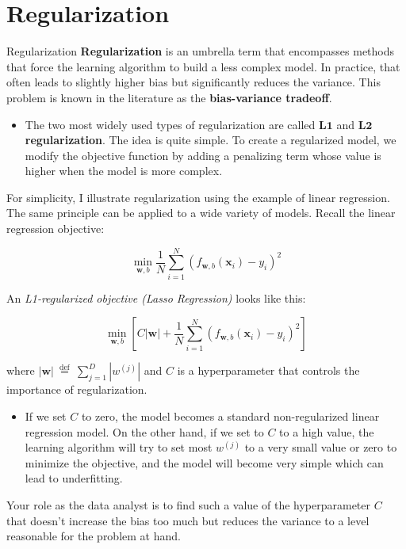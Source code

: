 \documentclass[8pt,dvipsnames]{beamer}
\begin{document}
\section{Regularization}
\begin{frame}{Regularization}
	\textbf{Regularization} is an umbrella term that encompasses methods that force the learning algorithm to build a less complex model. In practice, that often leads to slightly higher bias but significantly reduces the variance. This problem is known in the literature as the \textbf{bias-variance tradeoff}.
	\begin{itemize}
		\item The two most widely used types of regularization are called $\mathbf{L 1}$ and $\mathbf{L 2}$ \textbf{regularization}. The idea is quite simple. To create a regularized model, we modify the objective function by adding a penalizing term whose value is higher when the model is more complex.
	\end{itemize}
\end{frame}

\begin{frame}
	For simplicity, I illustrate regularization using the example of linear regression. The same principle can be applied to a wide variety of models.
	Recall the linear regression objective:

	$$
		\min _{\mathbf{w}, b} \frac{1}{N} \sum_{i=1}^{N}\left(f_{\mathbf{w}, b}\left(\mathbf{x}_{i}\right)-y_{i}\right)^{2}
	$$
\end{frame}

\begin{frame}
	An \textit{L1-regularized objective (Lasso Regression)} looks like this:

	$$
		\min _{\mathbf{w}, b}\left[C|\mathbf{w}|+\frac{1}{N} \sum_{i=1}^{N}\left(f_{\mathbf{w}, b}\left(\mathbf{x}_{i}\right)-y_{i}\right)^{2}\right]
	$$

	where $|\mathbf{w}| \stackrel{\text { def }}{=} \sum_{j=1}^{D}\left|w^{(j)}\right|$ and $C$ is a hyperparameter that controls the importance of regularization.
	\begin{itemize}
		\item If we set $C$ to zero, the model becomes a standard non-regularized linear regression model. On the other hand, if we set to $C$ to a high value, the learning algorithm will try to set most $w^{(j)}$ to a very small value or zero to minimize the objective, and the model will become very simple which can lead to underfitting.
	\end{itemize}
	Your role as the data analyst is to find such a value of the hyperparameter $C$ that doesn't increase the bias too much but reduces the variance to a level reasonable for the problem at hand.
\end{frame}
\end{document}
